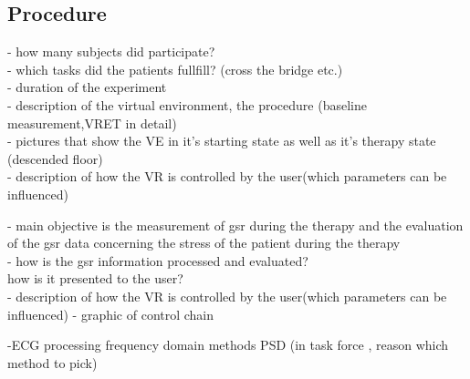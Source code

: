 \subsection{Procedure}
- how many subjects did participate?\\
- which tasks did the patients fullfill? (cross the bridge etc.)\\
- duration of the experiment\\

- description of the virtual environment, the procedure (baseline measurement,VRET in detail)\\ 
- pictures that show the VE in it's starting state as well as it's therapy state (descended floor)\\
- description of how the VR is controlled by the user(which parameters can be influenced)

- main objective is the measurement of gsr during the therapy and the evaluation of the gsr data concerning the stress of the patient during the therapy\\
- how is the gsr information processed and evaluated?\\
how is it presented to the user?\\
- description of how the VR is controlled by the user(which parameters can be influenced)
- graphic of control chain




-ECG processing frequency domain methods PSD (in task force , reason which method to pick)